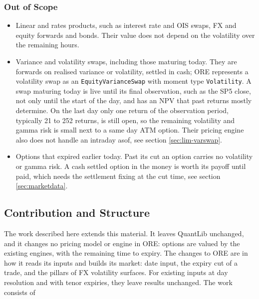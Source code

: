 \documentclass[12pt, a4paper]{article}
\begin{document}
\subsubsection*{Out of Scope}

\begin{itemize}
\item Linear and rates products, such as interest rate and OIS swaps, FX and equity forwards and bonds. Their value
  does not depend on the volatility over the remaining hours.
\item Variance and volatility swaps, including those maturing today. They are forwards on realised variance or
  volatility, settled in cash; ORE represents a volatility swap as an \texttt{EquityVarianceSwap} with moment type
  \texttt{Volatility}. A swap maturing today is live until its final observation, such as the SP5 close, not only
  until the start of the day, and has an NPV that past returns mostly determine. On the last day only one return of
  the observation period, typically 21 to 252 returns, is still open, so the remaining volatility and gamma risk is
  small next to a same day ATM option. Their pricing engine also does not handle an intraday asof, see section
  \ref{sec:lim-varswap}.
\item Options that expired earlier today. Past its cut an option carries no volatility or gamma risk. A cash settled
  option in the money is worth its payoff until paid, which needs the settlement fixing at the cut time, see section
  \ref{sec:marketdata}.
\end{itemize}

\subsection{Contribution and Structure}\label{sec:contribution}

The work described here extends this material. It leaves QuantLib unchanged, and it changes no pricing model or
engine in ORE: options are valued by the existing engines, with the remaining time to expiry. The changes to ORE are
in how it reads its inputs and builds its market: date input, the expiry cut of a trade, and the pillars of FX
volatility surfaces. For existing inputs at day resolution and with tenor expiries, they leave results unchanged. The
work consists of
\end{document}
